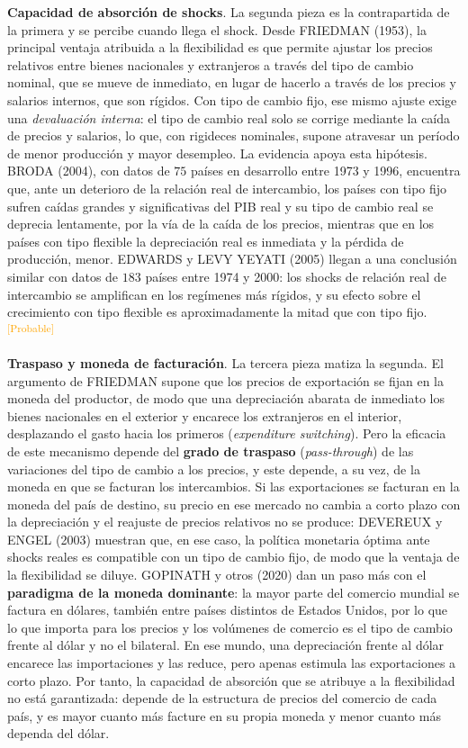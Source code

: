 \documentclass[10pt,a4paper]{article}
\begin{document}
\textbf{Capacidad de absorción de shocks}. La segunda pieza es la contrapartida de la primera y se percibe cuando llega el shock. Desde FRIEDMAN (1953), la principal ventaja atribuida a la flexibilidad es que permite ajustar los precios relativos entre bienes nacionales y extranjeros a través del tipo de cambio nominal, que se mueve de inmediato, en lugar de hacerlo a través de los precios y salarios internos, que son rígidos. Con tipo de cambio fijo, ese mismo ajuste exige una \textit{devaluación interna}: el tipo de cambio real solo se corrige mediante la caída de precios y salarios, lo que, con rigideces nominales, supone atravesar un período de menor producción y mayor desempleo. La evidencia apoya esta hipótesis. BRODA (2004), con datos de $75$ países en desarrollo entre 1973 y 1996, encuentra que, ante un deterioro de la relación real de intercambio, los países con tipo fijo sufren caídas grandes y significativas del PIB real y su tipo de cambio real se deprecia lentamente, por la vía de la caída de los precios, mientras que en los países con tipo flexible la depreciación real es inmediata y la pérdida de producción, menor. EDWARDS y LEVY YEYATI (2005) llegan a una conclusión similar con datos de $183$ países entre 1974 y 2000: los shocks de relación real de intercambio se amplifican en los regímenes más rígidos, y su efecto sobre el crecimiento con tipo flexible es aproximadamente la mitad que con tipo fijo.\textcolor{orange}{\textsuperscript{[Probable]}}

\textbf{Traspaso y moneda de facturación}. La tercera pieza matiza la segunda. El argumento de FRIEDMAN supone que los precios de exportación se fijan en la moneda del productor, de modo que una depreciación abarata de inmediato los bienes nacionales en el exterior y encarece los extranjeros en el interior, desplazando el gasto hacia los primeros (\textit{expenditure switching}). Pero la eficacia de este mecanismo depende del \textbf{grado de traspaso} (\textit{pass-through}) de las variaciones del tipo de cambio a los precios, y este depende, a su vez, de la moneda en que se facturan los intercambios. Si las exportaciones se facturan en la moneda del país de destino, su precio en ese mercado no cambia a corto plazo con la depreciación y el reajuste de precios relativos no se produce: DEVEREUX y ENGEL (2003) muestran que, en ese caso, la política monetaria óptima ante shocks reales es compatible con un tipo de cambio fijo, de modo que la ventaja de la flexibilidad se diluye. GOPINATH y otros (2020) dan un paso más con el \textbf{paradigma de la moneda dominante}: la mayor parte del comercio mundial se factura en dólares, también entre países distintos de Estados Unidos, por lo que lo que importa para los precios y los volúmenes de comercio es el tipo de cambio frente al dólar y no el bilateral. En ese mundo, una depreciación frente al dólar encarece las importaciones y las reduce, pero apenas estimula las exportaciones a corto plazo. Por tanto, la capacidad de absorción que se atribuye a la flexibilidad no está garantizada: depende de la estructura de precios del comercio de cada país, y es mayor cuanto más facture en su propia moneda y menor cuanto más dependa del dólar.
\end{document}
